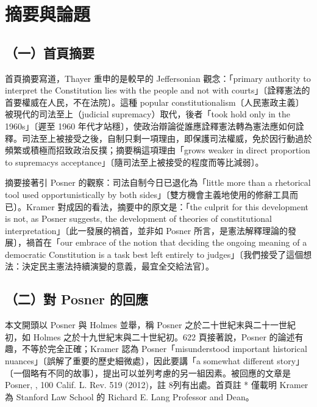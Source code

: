 \section{摘要與論題}
\label{sec:Kramer-1}

\subsection{（一）首頁摘要}

首頁摘要寫道，Thayer 重申的是較早的 Jeffersonian 觀念：「primary authority to interpret the Constitution lies with the people and not with courts」〔詮釋憲法的首要權威在人民，不在法院〕。這種 popular constitutionalism〔人民憲政主義〕被現代的司法至上（judicial supremacy）取代，後者「took hold only in the 1960s」〔遲至 1960 年代才站穩〕，使政治辯論從誰應詮釋憲法轉為憲法應如何詮釋。司法至上被接受之後，自制只剩一項理由，即保護司法權威，免於因行動過於頻繁或積極而招致政治反撲；摘要稱這項理由「grows weaker in direct proportion to supremacy\textquotesingle s acceptance」〔隨司法至上被接受的程度而等比減弱〕。

摘要接著引 Posner 的觀察：司法自制今日已退化為「little more than a rhetorical tool used opportunistically by both sides」〔雙方機會主義地使用的修辭工具而已〕。Kramer 對成因的看法，摘要中的原文是：「the culprit for this development is not, as Posner suggests, the development of theories of constitutional interpretation」〔此一發展的禍首，並非如 Posner 所言，是憲法解釋理論的發展〕，禍首在「our embrace of the notion that deciding the ongoing meaning of a democratic Constitution is a task best left entirely to judges」〔我們接受了這個想法：決定民主憲法持續演變的意義，最宜全交給法官〕。

\subsection{（二）對 Posner 的回應}

本文開頭以 Posner 與 Holmes 並舉，稱 Posner 之於二十世紀末與二十一世紀初，如 Holmes 之於十九世紀末與二十世紀初。622 頁接著說，Posner 的論述有趣，不等於完全正確；Kramer 認為 Posner「misunderstood important historical nuances」〔誤解了重要的歷史細微處〕，因此要講「a somewhat different story」〔一個略有不同的故事〕，提出可以並列考慮的另一組因素。被回應的文章是 Posner, , 100 Calif. L. Rev. 519 (2012)，註 8列有出處。首頁註 * 僅載明 Kramer 為 Stanford Law School 的 Richard E. Lang Professor and Dean。

